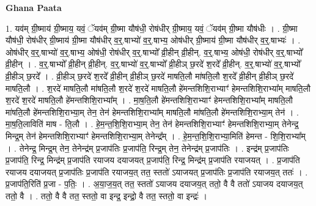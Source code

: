 \documentclass[17pt]{extarticle}
\begin{document}
\textbf{Ghana Paata } \newline

1. यव॑म् ग्री॒ष्माय॑ ग्री॒ष्माय॒ यवं॒ ॅयव॑म् ग्री॒ष्मा यौष॑धी॒ रोष॑धीर् ग्री॒ष्माय॒ यवं॒ ॅयव॑म् ग्री॒ष्मा यौष॑धीः । . ग्री॒ष्मा यौष॑धी॒ रोष॑धीर् ग्री॒ष्माय॑ ग्री॒ष्मा यौष॑धीर् व॒र्॒.षाभ्यो॑ व॒र्॒.षाभ्य॒ ओष॑धीर् ग्री॒ष्माय॑ ग्री॒ष्मा यौष॑धीर् व॒र्॒.षाभ्यः॑ । . ओष॑धीर् व॒र्॒.षाभ्यो॑ व॒र्॒.षाभ्य॒ ओष॑धी॒ रोष॑धीर् व॒र्॒.षाभ्यो᳚ व्री॒हीन् व्री॒हीन्. व॒र्॒.षाभ्य॒ ओष॑धी॒ रोष॑धीर् व॒र्॒.षाभ्यो᳚ व्री॒हीन् । . व॒र्॒.षाभ्यो᳚ व्री॒हीन् व्री॒हीन्. व॒र्॒.षाभ्यो॑ व॒र्॒.षाभ्यो᳚ व्री॒हीञ् छ॒रदे॑ श॒रदे᳚ व्री॒हीन्. व॒र्॒.षाभ्यो॑ व॒र्॒.षाभ्यो᳚ व्री॒हीञ् छ॒रदे᳚ । . व्री॒हीञ् छ॒रदे॑ श॒रदे᳚ व्री॒हीन् व्री॒हीञ् छ॒रदे॑ माषति॒लौ मा॑षति॒लौ श॒रदे᳚ व्री॒हीन् व्री॒हीञ् छ॒रदे॑ माषति॒लौ । . श॒रदे॑ माषति॒लौ मा॑षति॒लौ श॒रदे॑ श॒रदे॑ माषति॒लौ हे॑मन्तशिशि॒राभ्याꣳ॑ हेमन्तशिशि॒राभ्या᳚म् माषति॒लौ श॒रदे॑ श॒रदे॑ माषति॒लौ हे॑मन्तशिशि॒राभ्या᳚म् । . मा॒ष॒ति॒लौ हे॑मन्तशिशि॒राभ्याꣳ॑ हेमन्तशिशि॒राभ्या᳚म् माषति॒लौ मा॑षति॒लौ हे॑मन्तशिशि॒राभ्या॒म् तेन॒ तेन॑ हेमन्तशिशि॒राभ्या᳚म् माषति॒लौ मा॑षति॒लौ हे॑मन्तशिशि॒राभ्या॒म् तेन॑ । . मा॒ष॒ति॒लाविति॑ माष - ति॒लौ । . हे॒म॒न्त॒शि॒शि॒राभ्या॒म् तेन॒ तेन॑ हेमन्तशिशि॒राभ्याꣳ॑ हेमन्तशिशि॒राभ्या॒म् तेनेन्द्र॒ मिन्द्र॒म् तेन॑ हेमन्तशिशि॒राभ्याꣳ॑ हेमन्तशिशि॒राभ्या॒म् तेनेन्द्र᳚म् । . हे॒म॒न्त॒शि॒शि॒राभ्या॒मिति॑ हेमन्त - शि॒शि॒राभ्या᳚म् । . तेनेन्द्र॒ मिन्द्र॒म् तेन॒ तेनेन्द्र॑म् प्र॒जाप॑तिः प्र॒जाप॑ति॒ रिन्द्र॒म् तेन॒ तेनेन्द्र॑म् प्र॒जाप॑तिः । . इन्द्र॑म् प्र॒जाप॑तिः प्र॒जाप॑ति॒ रिन्द्र॒ मिन्द्र॑म् प्र॒जाप॑ति रयाजय दयाजयत् प्र॒जाप॑ति॒ रिन्द्र॒ मिन्द्र॑म् प्र॒जाप॑ति रयाजयत् । . प्र॒जाप॑ति रयाजय दयाजयत् प्र॒जाप॑तिः प्र॒जाप॑ति रयाजय॒त् तत॒ स्ततो॑ ऽयाजयत् प्र॒जाप॑तिः प्र॒जाप॑ति रयाजय॒त् ततः॑ । . प्र॒जाप॑ति॒रिति॑ प्र॒जा - प॒तिः॒ । . अ॒या॒ज॒य॒त् तत॒ स्ततो॑ ऽयाजय दयाजय॒त् ततो॒ वै वै ततो॑ ऽयाजय दयाजय॒त् ततो॒ वै । . ततो॒ वै वै तत॒ स्ततो॒ वा इन्द्र॒ इन्द्रो॒ वै तत॒ स्ततो॒ वा इन्द्रः॑ । \newline
\end{document}
